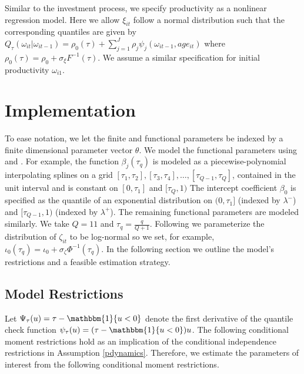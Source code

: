 \documentclass{article}
\begin{document}
 Similar to the investment process, we specify productivity as a nonlinear regression model. Here we allow $\xi_{it}$ follow a normal distribution such that the corresponding quantiles are given by $Q_{\tau}(\omega_{it}| \omega_{it-1})=\rho_{0}(\tau)+\sum_{j=1}^{J}\rho_{j}\psi_{j}(\omega_{it-1}, age_{it})$ where $\rho_{0}(\tau)=\rho_{0}+\sigma_{\xi}F^{-1}(\tau)$. We assume a similar specification for initial productivity $\omega_{i1}$.

\section{Implementation}
To ease notation, we let the finite and functional parameters be indexed by a finite dimensional parameter vector $\theta$. We model the functional parameters using \cite{Wei2009} and \cite{Arellano2016}. For example, the function $\beta_{j}(\tau_{q})$ is modeled as a piecewise-polynomial interpolating splines on a grid $[\tau_{1},\tau_{2}], [\tau_{3},\tau_{4}],\dots, [\tau_{Q-1},\tau_{Q}]$, contained in the unit interval and is constant on $[0, \tau_{1}]$ and $[\tau_{Q}, 1)$ The intercept coefficient $\beta_{0}$ is specified as the quantile of an exponential distribution on $(0,\tau_{1}]$ (indexed by $\lambda^{-}$) and $[\tau_{Q-1}, 1)$ (indexed by $\lambda^{+}$). The remaining functional parameters are modeled similarly. We take $Q=11$ and $\tau_{q}=\frac{q}{Q+1}$. Following \cite{Arellano2017} we parameterize the distribution of $\zeta_{it}$ to be log-normal so we set, for example, $\iota_{0}(\tau_{q})=\iota_{0}+\sigma_{\zeta}\Phi^{-1}(\tau_{q})$. In the following section we outline the model's restrictions and a feasible estimation strategy.

\subsection{Model Restrictions}
Let $\Psi_{\tau}(u)=\tau-\mathbbm{1}\{u<0\}$ denote the first derivative of the quantile check function $\psi_{\tau}(u)=(\tau-\mathbbm{1}\{u<0\})u$. The following conditional moment restrictions hold as an implication of the conditional independence restrictions in Assumption \eqref{pdynamics}. Therefore, we estimate the parameters of interest from the following conditional moment restrictions.
\end{document}
